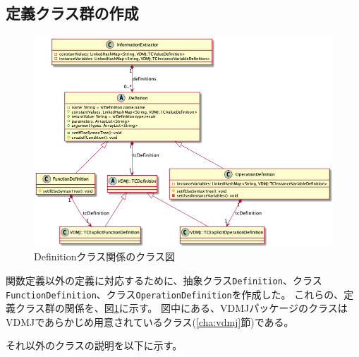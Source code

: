 \documentclass[uplatex, report, a4j, 10pt]{jsbook}
\newcommand\ttt[1]{\texttt{#1}}
\begin{document}
\subsection{定義クラス群の作成}\label{sec:create_definition}
\begin{figure}[tp]
  \centering
  \includegraphics[keepaspectratio, width=160mm]{figs/Definition_class_diagram}
  \caption{Definitionクラス関係のクラス図}
  \label{fig:definition_class}
\end{figure}

関数定義以外の定義に対応するために、抽象クラス\ttt{Definition}、クラス\ttt{FunctionDefinition}、クラス\ttt{OperationDefinition}を作成した。
これらの、定義クラス群の関係を、図\ref{fig:definition_class}に示す。
図中にある、VDMJパッケージのクラスはVDMJであらかじめ用意されているクラス(\ref{cha:vdmj}節)である。

それ以外のクラスの説明を以下に示す。
\end{document}
